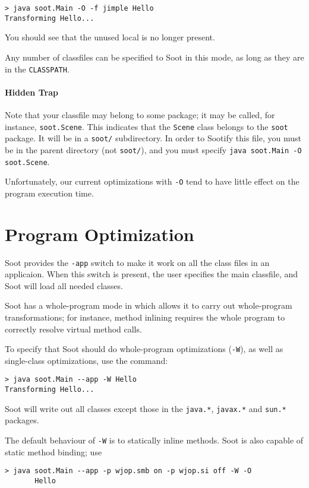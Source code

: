 \documentclass{article}
\begin{document}
\begin{verbatim}
> java soot.Main -O -f jimple Hello
Transforming Hello...
\end{verbatim}

You should see that the unused local is no longer present.

Any number of classfiles can be specified to Soot in this mode, as
long as they are in the {\tt CLASSPATH}.

\paragraph{Hidden Trap} Note that your classfile may belong to some
package; it may be called, for instance, {\tt soot.Scene}.  This
indicates that the {\tt Scene} class belongs to the {\tt soot} package.
It will be in a {\tt soot/} subdirectory.  In order to Sootify this
file, you must be in the parent directory (not {\tt soot/}), and you
must specify {\tt java soot.Main -O soot.Scene}.

Unfortunately, our current optimizations with {\tt -O} tend to have
little effect on the program execution time.

\section{Program Optimization}

Soot provides the {\tt -app} switch to make it work on all the class
files in an applicaion. When this switch is present, the user specifies
the main classfile, and Soot will load all needed classes.

Soot has a whole-program mode in which allows it to carry out
whole-program transformations; for instance, method inlining requires
the whole program to correctly resolve virtual method calls.

To specify that Soot should do whole-program optimizations ({\tt -W}),
as well as single-class optimizations, use the command:

\begin{verbatim}
> java soot.Main --app -W Hello
Transforming Hello...
\end{verbatim}

Soot will write out all classes except those in the {\tt java.*},
{\tt javax.*} and {\tt sun.*} packages.

The default behaviour of {\tt -W} is to statically inline methods.
Soot is also capable of static method binding; use 

\begin{verbatim}
> java soot.Main --app -p wjop.smb on -p wjop.si off -W -O
       Hello
\end{verbatim}
\end{document}
